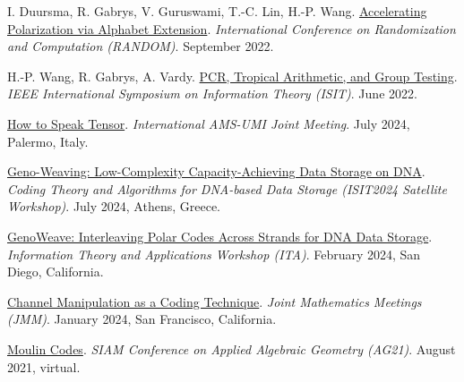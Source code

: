 \documentclass{article}
\def\sec#1{\vskip1em\textbf{\fs1#1}}
\def\fs#1{%
        \pgfmathsetmacro\a{#1}%
        \pgfmathsetmacro\A{\parskip*(4/3)^\a}%
        \pgfmathsetmacro\B{\A*(4/3)}%
        \fontsize{\A pt}{\B pt}\selectfont%
    }
\begin{document}
\begin{thebibliography}{C99}
    I. Duursma, R. Gabrys, V. Guruswami, T.-C. Lin, H.-P. Wang.
    \href{https://doi.org/10.4230/LIPIcs.APPROX/RANDOM.2022.17}
    {Accelerating Polarization via Alphabet Extension}.
    \emph{International Conference on Randomization and Computation (RANDOM)}.
    September 2022.

    H.-P. Wang, R. Gabrys, A. Vardy.
    \href{https://doi.org/10.1109/ISIT50566.2022.9834718}
    {PCR, Tropical Arithmetic, and Group Testing}.
    \emph{IEEE International Symposium on Information Theory (ISIT)}.
    June 2022.
\end{thebibliography}
\egroup

\bgroup
\def\section#1#2{\sec{Invited Talks \mdseries (new to old)}}
\begin{thebibliography}{T9}
    \href{(https://umi.dm.unibo.it/jm-umi-ams/special-sessions/special-sessions-on-25-26-july-2024/)}
    {How to Speak Tensor}.
    \emph{International AMS-UMI Joint Meeting}.
    July 2024, Palermo, Italy.

    \href{https://www.ce.cit.tum.de/en/lnt/events/2024-coding-theory-and-algorithms-for-dna-based-data-storage/program/}
    {Geno-Weaving: Low-Complexity Capacity-Achieving Data Storage on DNA}.
    \emph{Coding Theory and Algorithms for DNA-based Data Storage (ISIT2024 Satellite Workshop)}.
    July 2024, Athens, Greece.

    \href{https://ita.ucsd.edu/workshop/schedule}
    {GenoWeave: Interleaving Polar Codes Across Strands for DNA Data Storage}.
    \emph{Information Theory and Applications Workshop (ITA)}.
    February 2024, San Diego, California.

    \href{https://meetings.ams.org/math/jmm2024/meetingapp.cgi/Paper/29146}
    {Channel Manipulation as a Coding Technique}.
    \emph{Joint Mathematics Meetings (JMM)}.
    January 2024, San Francisco, California.

    \href{https://meetings.siam.org/sess/dsp_programsess.cfm?SESSIONCODE=72368}
    {Moulin Codes}.
    \emph{SIAM Conference on Applied Algebraic Geometry (AG21)}.
    August 2021, virtual.
\end{thebibliography}
\egroup
\end{document}
